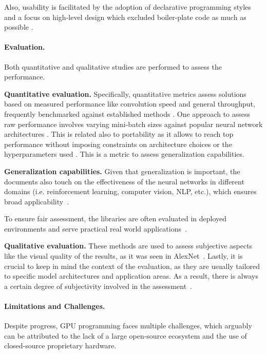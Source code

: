 Also, usability is facilitated by the adoption of declarative programming styles and a focus on
high-level design which excluded boiler-plate code as much as possible .

\paragraph{Evaluation.}
Both quantitative and qualitative studies are performed to assess the performance.

\textbf{Quantitative evaluation.}
Specifically, quantitative metrics assess solutions based on measured performance like convolution speed
and general throughput, frequently benchmarked against established methods .
One approach to assess raw performance involves varying mini-batch sizes against popular neural network
architectures . This is related also to portability as it allows to reach top
performance without imposing constraints on architecture choices or the hyperparameters used
. This is a metric to assess generalization capabilities.

\textbf{Generalization capabilities.}
Given that generalization is important, the documents also touch on the effectiveness of the neural
networks in different domains (i.e. reinforcement learning, computer vision, NLP, etc.), which
ensures broad applicability~.

To ensure fair assessment, the libraries are often evaluated in deployed environments and serve
practical real world applications~.

\textbf{Qualitative evaluation.}
These methods are used to assess subjective aspects like the visual quality of the results, as it was
seen in AlexNet~. Lastly, it is crucial to keep in mind the context of the evaluation,
as they are usually tailored to specific model architectures and application areas. As a result,
there is always a certain degree of subjectivity involved in the assessment~.

\paragraph{Limitations and Challenges.}
Despite progress, GPU programming faces multiple challenges, which arguably can be attributed to
the lack of a large open-source ecosystem and the use of closed-source proprietary hardware.

